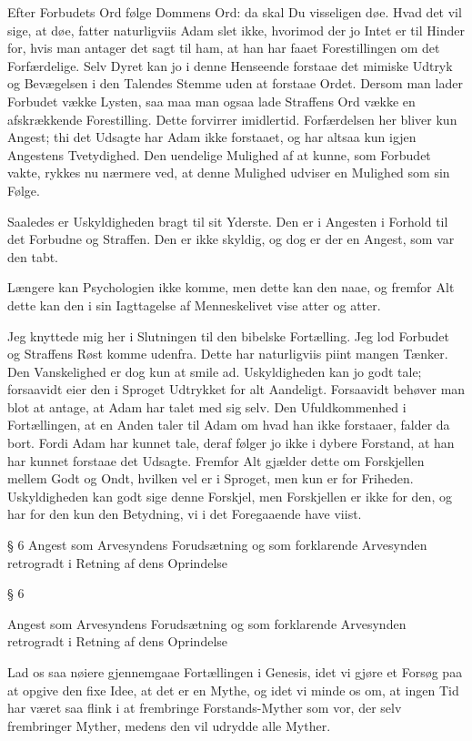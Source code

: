 \documentclass[12pt,a4paper]{article}
\begin{document}
Efter Forbudets Ord følge Dommens Ord: da skal Du visseligen døe. Hvad det vil sige, at døe, fatter naturligviis Adam slet ikke, hvorimod der jo Intet er til Hinder for, hvis man antager det sagt til ham, at han har faaet Forestillingen om det Forfærdelige. Selv Dyret kan jo i denne Henseende forstaae det mimiske Udtryk og Bevægelsen i den Talendes Stemme uden at forstaae Ordet. Dersom man lader Forbudet vække Lysten, saa maa man ogsaa lade Straffens Ord vække en afskrækkende Forestilling. Dette forvirrer imidlertid. Forfærdelsen her bliver kun Angest; thi det Udsagte har Adam ikke forstaaet, og har altsaa kun igjen Angestens Tvetydighed. Den uendelige Mulighed af at kunne, som Forbudet vakte, rykkes nu nærmere ved, at denne Mulighed udviser en Mulighed som sin Følge.

Saaledes er Uskyldigheden bragt til sit Yderste. Den er i Angesten i Forhold til det Forbudne og Straffen. Den er ikke skyldig, og dog er der en Angest, som var den tabt.

Længere kan Psychologien ikke komme, men dette kan den naae, og fremfor Alt dette kan den i sin Iagttagelse af Menneskelivet vise atter og atter.

Jeg knyttede mig her i Slutningen til den bibelske Fortælling. Jeg lod Forbudet og Straffens Røst komme udenfra. Dette har naturligviis piint mangen Tænker. Den Vanskelighed er dog kun at smile ad. Uskyldigheden kan jo godt tale; forsaavidt eier den i Sproget Udtrykket for alt Aandeligt. Forsaavidt behøver man blot at antage, at Adam har talet med sig selv. Den Ufuldkommenhed i Fortællingen, at en Anden taler til Adam om hvad han ikke forstaaer, falder da bort. Fordi Adam har kunnet tale, deraf følger jo ikke i dybere Forstand, at han har kunnet forstaae det Udsagte. Fremfor Alt gjælder dette om Forskjellen mellem Godt og Ondt, hvilken vel er i Sproget, men kun er for Friheden. Uskyldigheden kan godt sige denne Forskjel, men Forskjellen er ikke for den, og har for den kun den Betydning, vi i det Foregaaende have viist.

§ 6 Angest som Arvesyndens Forudsætning og som forklarende Arvesynden retrogradt i Retning af dens Oprindelse

§ 6

Angest som Arvesyndens Forudsætning og som forklarende Arvesynden retrogradt i Retning af dens Oprindelse

Lad os saa nøiere gjennemgaae Fortællingen i Genesis, idet vi gjøre et Forsøg paa at opgive den fixe Idee, at det er en Mythe, og idet vi minde os om, at ingen Tid har været saa flink i at frembringe Forstands-Myther som vor, der selv frembringer Myther, medens den vil udrydde alle Myther.
\end{document}

